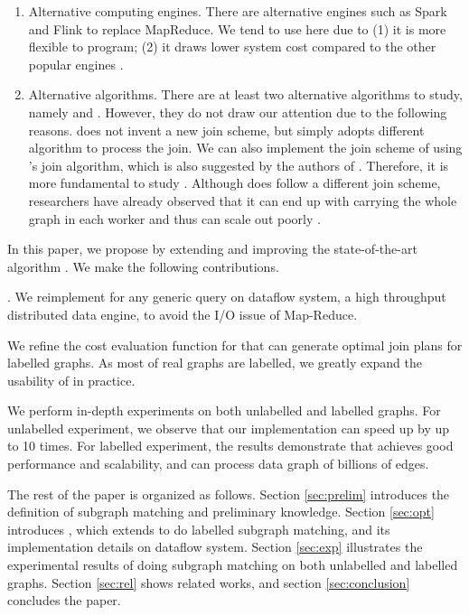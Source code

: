 \begin{enumerate}
    \item Alternative computing engines. There are alternative engines such as Spark \cite{spark} and Flink \cite{flink} to replace MapReduce. We tend to use \timely here due to (1) it is more flexible to program; (2) it draws lower system cost compared to the other popular engines \cite{McSherry2015}.
    \item Alternative algorithms. There are at least two alternative algorithms to study, namely \bigjoin and \multiwayjoin. However, they do not draw our attention due to the following reasons. \bigjoin does not invent a new join scheme, but simply adopts different algorithm to process the join. We can also implement the join scheme of \cliquejoin using \bigjoin's join algorithm, which is also suggested by the authors of \bigjoin \cite{Ammar2018}. Therefore, it is more fundamental to study \cliquejoin. Although \multiwayjoin does follow a different join scheme, researchers have already observed that it can end up with carrying the whole graph in each worker and thus can scale out poorly \cite{Lai2016, Ammar2018}.   
\end{enumerate}

 In this paper, we propose \gencliqjoin by extending and improving the state-of-the-art algorithm \cliquejoin. We make the following contributions.

. We reimplement \cliquejoin for any generic query on \timely dataflow system, a high throughput distributed data engine, to avoid the I/O issue of Map-Reduce. 

 We refine the cost evaluation function for \cliquejoin that can generate optimal join plans for labelled graphs. As most of real graphs are labelled, we greatly expand the usability of \cliquejoin in practice.

 We perform in-depth experiments on both unlabelled and labelled graphs. For unlabelled experiment, we observe that our implementation can speed up \cliquejoin by up to 10 times. For labelled experiment, the results demonstrate that \gencliqjoin achieves good performance and scalability, and can process data graph of billions of edges.

 The rest of the paper is organized as follows. Section \ref{sec:prelim} introduces the definition of subgraph matching and preliminary knowledge. Section \ref{sec:opt} introduces \gencliqjoin, which extends \cliquejoin to do labelled subgraph matching, and its implementation details on \timely dataflow system. Section \ref{sec:exp} illustrates the experimental results of doing subgraph matching on both unlabelled and labelled graphs. Section \ref{sec:rel} shows related works, and section \ref{sec:conclusion} concludes the paper.